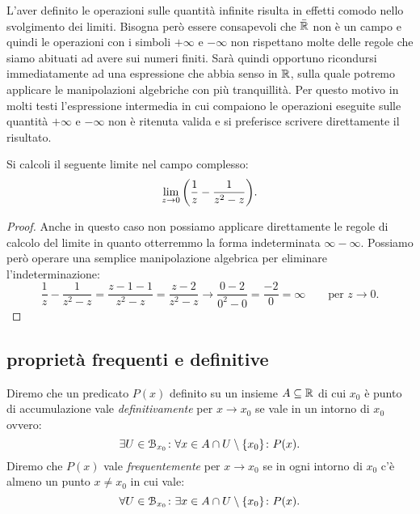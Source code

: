 L'aver definito le operazioni sulle quantità infinite
risulta in effetti comodo nello svolgimento dei limiti.
Bisogna però essere consapevoli che $\bar {{\mathbb R}}$ non è un campo
e quindi le operazioni con i simboli $+\infty$ e $-\infty$
non rispettano molte delle regole che siamo abituati
ad avere sui numeri finiti.
Sarà quindi opportuno ricondursi immediatamente ad una espressione
che abbia senso in ${\mathbb R}$, sulla quale potremo
applicare le manipolazioni algebriche con più tranquillità.
Per questo motivo in molti testi l'espressione intermedia in cui compaiono 
le operazioni eseguite sulle quantità $+\infty$ e $-\infty$ non è ritenuta valida
e si preferisce scrivere direttamente il risultato.
  
\begin{example}
Si calcoli il seguente limite nel campo complesso:
\[
\lim_{z\to 0} {\left( \frac 1 {z} - \frac 1 {z^2-z} \right)}. 
\]
\end{example}
\begin{proof}
  Anche in questo caso non possiamo applicare direttamente le regole 
  di calcolo del limite in quanto otterremmo la forma indeterminata 
  $\infty - \infty$.
  Possiamo però operare una semplice manipolazione algebrica
  per eliminare l'indeterminazione:
  \[
    \frac 1 {z} - \frac 1 {z^2-z}
    = \frac{z- 1 - 1}{z^2-z}
    = \frac{z-2}{z^2-z}
    \to \frac{0-2}{0^2-0} = \frac{-2}{0} = \infty 
    \qquad \text{per $z\to 0.$}
  \]
\end{proof}

\begin{comment} %
\begin{exercise}
  Calcolare 
  \[
  \lim_{x\to 0^+} x^x.
  \]
\end{exercise}

\begin{exercise}
  Trovare un esempio di funzioni $f(x)$ e $g(x)$ tali che 
  \[
     \lim_{x\to 0} f(x) = 0, \qquad 
     \lim_{x\to 0} g(x) = 0
  \]
  ma 
  \[
    \lim_{x\to 0} f(x)^{g(x)} \neq 1.
  \]
\end{exercise}
\end{comment}

\subsection{proprietà frequenti e definitive}

\begin{definition}
Diremo che un predicato $P(x)$ definito su un insieme $A\subseteq {\mathbb R}$ 
di cui $x_0$ è punto di accumulazione vale 
\emph{definitivamente}%
%
 per $x\to x_0$ se
vale in un intorno di $x_0$ ovvero:
\[
  \exists U\in \mathcal B_{x_0}\colon \forall x \in A\cap U\setminus{\left\{ x_0 \right\}}\colon P(x).
\]
Diremo che $P(x)$ vale \emph{frequentemente}%
%
 per $x\to x_0$
se in ogni intorno di $x_0$ c'è almeno un punto $x\neq x_0$ 
in cui vale:
\[
  \forall U\in \mathcal B_{x_0}\colon \exists x\in A\cap U\setminus{\left\{ x_0 \right\}}
  \colon P(x).
\]
\end{definition}

